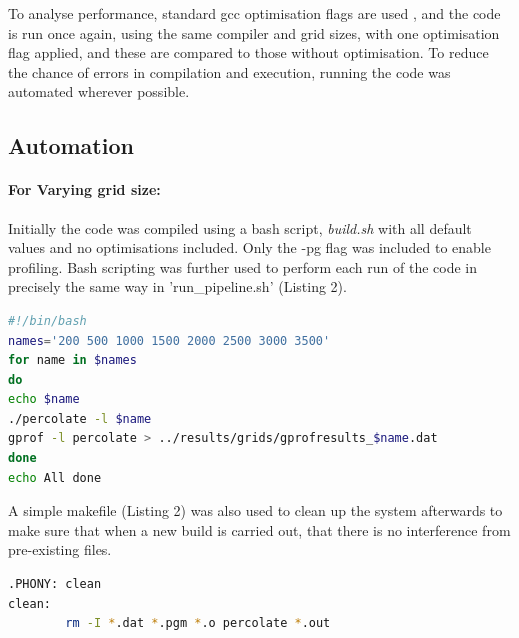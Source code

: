 \documentclass[12pt,a4paper]{article}
\begin{document}
To analyse performance, standard gcc optimisation flags are used \cite{ref:flags}, and the code is run once again, using the same compiler and grid sizes, with one optimisation flag applied, and these are compared to those without optimisation. To reduce the chance of errors in compilation and execution, running the code was automated wherever possible.

\subsection{Automation}\label{automation}

\paragraph{For Varying grid size:}
Initially the code was compiled using a bash script, {\em build.sh} with all default values and no optimisations included. Only the -pg flag was included to enable profiling. Bash scripting was further used to perform each run of the code in precisely the same way in 'run\_pipeline.sh' (Listing 2).
\begin{lstlisting}[language = bash, caption="run\_pipeline.sh" to execute percolate in the same way for varying grid sizes.]
#!/bin/bash
names='200 500 1000 1500 2000 2500 3000 3500'
for name in $names
do
echo $name
./percolate -l $name
gprof -l percolate > ../results/grids/gprofresults_$name.dat
done
echo All done
\end{lstlisting}

A simple makefile (Listing 2) was also used to clean up the system afterwards to make sure that when a new build is carried out, that there is no interference from pre-existing files.

\begin{lstlisting}[language = bash, caption="Makefile" to clean out executable files and object files between builds]
.PHONY: clean
clean:
      	rm -I *.dat *.pgm *.o percolate *.out
\end{lstlisting}
\end{document}

